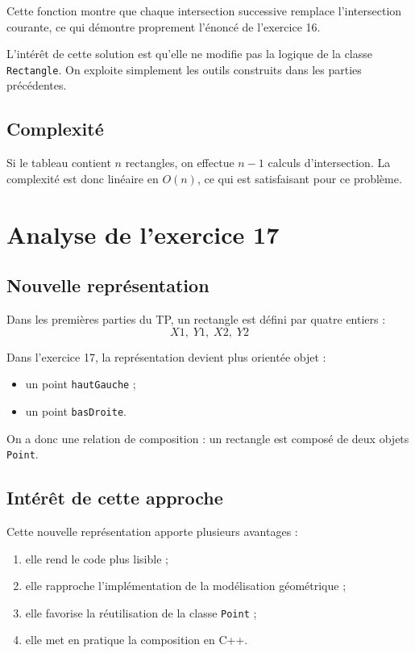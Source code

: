 \documentclass[12pt,a4paper]{article}
\begin{document}
Cette fonction montre que chaque intersection successive remplace l'intersection courante, ce qui d\'emontre proprement l'\'enonc\'e de l'exercice 16.

L'int\'er\^et de cette solution est qu'elle ne modifie pas la logique de la classe \texttt{Rectangle}. On exploite simplement les outils construits dans les parties pr\'ec\'edentes.

\subsection{Complexit\'e}
Si le tableau contient $n$ rectangles, on effectue $n-1$ calculs d'intersection. La complexit\'e est donc lin\'eaire en $O(n)$, ce qui est satisfaisant pour ce probl\`eme.

\section{Analyse de l'exercice 17}
\subsection{Nouvelle repr\'esentation}
Dans les premi\`eres parties du TP, un rectangle est d\'efini par quatre entiers :
\[
X1,\;Y1,\;X2,\;Y2
\]

Dans l'exercice 17, la repr\'esentation devient plus orient\'ee objet :
\begin{itemize}[leftmargin=*]
    \item un point \texttt{hautGauche} ;
    \item un point \texttt{basDroite}.
\end{itemize}

On a donc une relation de composition : un rectangle est compos\'e de deux objets \texttt{Point}.

\subsection{Int\'er\^et de cette approche}
Cette nouvelle repr\'esentation apporte plusieurs avantages :
\begin{enumerate}[leftmargin=*]
    \item elle rend le code plus lisible ;
    \item elle rapproche l'impl\'ementation de la mod\'elisation g\'eom\'etrique ;
    \item elle favorise la r\'eutilisation de la classe \texttt{Point} ;
    \item elle met en pratique la composition en C++.
\end{enumerate}
\end{document}
